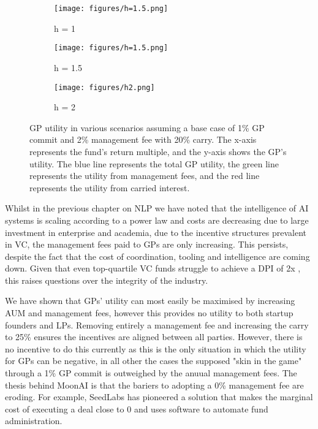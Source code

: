 \documentclass[a4paper, oneside]{discothesis}
\begin{document}
\begin{figure}[htbp]
    \centering
    \begin{subfigure}[b]{0.32\textwidth}
      \centering
      \texttt{[image: figures/h=1.5.png]}
      \caption{h = 1}
      \label{fig:h1}
    \end{subfigure}
    \hfill
    \begin{subfigure}[b]{0.32\textwidth}
      \centering
      \texttt{[image: figures/h=1.5.png]}
      \caption{h = 1.5}
      \label{fig:h1.5}
    \end{subfigure}
    \hfill
    \begin{subfigure}[b]{0.32\textwidth}
      \centering
      \texttt{[image: figures/h2.png]}
      \caption{h = 2}
      \label{fig:h2}
    \end{subfigure}
    \caption{GP utility in various scenarios assuming a base case of 1\% GP commit and 2\% management fee with 20\% carry. The x-axis represents the fund's return multiple, and the y-axis shows the GP's utility. The blue line represents the total GP utility, the green line represents the utility from management fees, and the red line represents the utility from carried interest.}
    \label{fig:gp_utility_scenarios}
    \end{figure}

Whilst in the previous chapter on NLP we have noted that the intelligence of AI systems is scaling according to a power law and costs are decreasing due to large investment in enterprise and academia, due to the incentive structures prevalent in VC, the management fees paid to GPs are only increasing. This persists, despite the fact that the cost of coordination, tooling and intelligence are coming down. Given that even top-quartile VC funds struggle to achieve a DPI of 2x \cite{gompers1994riseandfallofvc}, this raises questions over the integrity of the industry. 

We have shown that GPs' utility can most easily be maximised by increasing AUM and management fees, however this provides no utility to both startup founders and LPs. Removing entirely a management fee and increasing the carry to 25\% ensures the incentives are aligned between all parties. However, there is no incentive to do this currently as this is the only situation in which the utility for GPs can be negative, in all other the cases the supposed "skin in the game" through a 1\% GP commit is outweighed by the anuual management fees. The thesis behind MoonAI is that the bariers to adopting a 0\% management fee are eroding. For example, SeedLabs has pioneered a solution that makes the marginal cost of executing a deal close to 0 and uses software to automate fund administration. 
\end{document}

